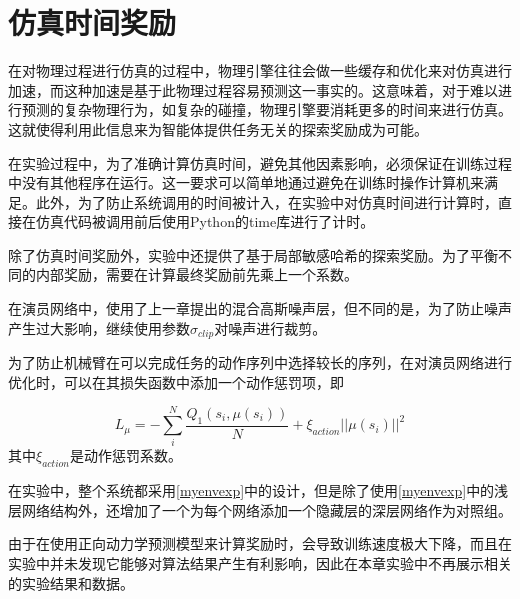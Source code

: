 \section{仿真时间奖励}

在对物理过程进行仿真的过程中，物理引擎往往会做一些缓存和优化来对仿真进行加速，而这种加速是基于此物理过程容易预测这一事实的。这意味着，对于难以进行预测的复杂物理行为，如复杂的碰撞，物理引擎要消耗更多的时间来进行仿真。这就使得利用此信息来为智能体提供任务无关的探索奖励成为可能。

在实验过程中，为了准确计算仿真时间，避免其他因素影响，必须保证在训练过程中没有其他程序在运行。这一要求可以简单地通过避免在训练时操作计算机来满足。此外，为了防止系统调用的时间被计入，在实验中对仿真时间进行计算时，直接在仿真代码被调用前后使用Python的time库进行了计时。

除了仿真时间奖励外，实验中还提供了基于局部敏感哈希的探索奖励。为了平衡不同的内部奖励，需要在计算最终奖励前先乘上一个系数。

在演员网络中，使用了上一章提出的混合高斯噪声层，但不同的是，为了防止噪声产生过大影响，继续使用参数$\sigma_{clip}$对噪声进行裁剪。

为了防止机械臂在可以完成任务的动作序列中选择较长的序列，在对演员网络进行优化时，可以在其损失函数中添加一个动作惩罚项，即

   $$ L_\mu = -\sum_i^N\frac{Q_1(s_i, \mu(s_i))}{N} + \xi_{action}||\mu(s_i)||^2$$
其中$\xi_{action}$是动作惩罚系数。

在实验中，整个系统都采用\ref{myenvexp}中的设计，但是除了使用\ref{myenvexp}中的浅层网络结构外，还增加了一个为每个网络添加一个隐藏层的深层网络作为对照组。

由于在使用正向动力学预测模型来计算奖励时，会导致训练速度极大下降，而且在实验中并未发现它能够对算法结果产生有利影响，因此在本章实验中不再展示相关的实验结果和数据。

